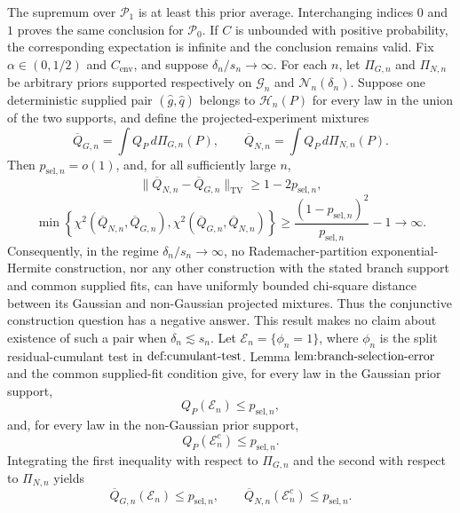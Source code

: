 The supremum over \(\mathcal P_1\) is at least this prior average.  Interchanging indices \(0\) and \(1\) proves the same conclusion for \(\mathcal P_0\).  If \(C\) is unbounded with positive probability, the corresponding expectation is infinite and the conclusion remains valid.
Fix \(\alpha\in(0,1/2)\) and \(C_{\mathrm{env}}\), and suppose \(\delta_n/s_n\to\infty\).  For each \(n\), let \(\Pi_{G,n}\) and \(\Pi_{N,n}\) be arbitrary priors supported respectively on \(\mathcal G_n\) and \(\mathcal N_n(\delta_n)\).  Suppose one deterministic supplied pair \((\widehat g,\widehat q)\) belongs to \(\mathcal H_n(P)\) for every law in the union of the two supports, and define the projected-experiment mixtures
\[
 \overline Q_{G,n}=\int Q_P\,d\Pi_{G,n}(P),
 \qquad
 \overline Q_{N,n}=\int Q_P\,d\Pi_{N,n}(P).
\]
Then \(p_{\mathrm{sel},n}=o(1)\), and, for all sufficiently large \(n\),
\[
 \|\overline Q_{N,n}-\overline Q_{G,n}\|_{\mathrm{TV}}
 \ge1-2p_{\mathrm{sel},n},
\]
\[
 \min\left\{
 \chi^2(\overline Q_{N,n},\overline Q_{G,n}),
 \chi^2(\overline Q_{G,n},\overline Q_{N,n})
 \right\}
 \ge \frac{(1-p_{\mathrm{sel},n})^2}{p_{\mathrm{sel},n}}-1
 \longrightarrow\infty.
\]
Consequently, in the regime \(\delta_n/s_n\to\infty\), no Rademacher-partition exponential-Hermite construction, nor any other construction with the stated branch support and common supplied fits, can have uniformly bounded chi-square distance between its Gaussian and non-Gaussian projected mixtures.  Thus the conjunctive construction question has a negative answer.  This result makes no claim about existence of such a pair when \(\delta_n\lesssim s_n\).
Let \(\mathcal E_n=\{\phi_n=1\}\), where \(\phi_n\) is the split residual-cumulant test in \(\textup{def:cumulant-test}\).  Lemma \(\textup{lem:branch-selection-error}\) and the common supplied-fit condition give, for every law in the Gaussian prior support,
\[
 Q_P(\mathcal E_n)\le p_{\mathrm{sel},n},
\]
and, for every law in the non-Gaussian prior support,
\[
 Q_P(\mathcal E_n^c)\le p_{\mathrm{sel},n}.
\]
Integrating the first inequality with respect to \(\Pi_{G,n}\) and the second with respect to \(\Pi_{N,n}\) yields
\[
 \overline Q_{G,n}(\mathcal E_n)\le p_{\mathrm{sel},n},
 \qquad
 \overline Q_{N,n}(\mathcal E_n^c)\le p_{\mathrm{sel},n}.
\tag{1}
\]

